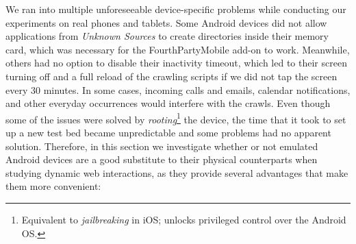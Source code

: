 \documentclass{acm_proc_article-sp}
\begin{document}
We ran into multiple unforeseeable device-specific problems while conducting our experiments on real phones and tablets. Some Android devices did not allow applications from \emph{Unknown Sources} to create directories inside their memory card, which was necessary for the FourthPartyMobile add-on to work. Meanwhile, others had no option to disable their inactivity timeout, which led to their screen turning off and a full reload of the crawling scripts if we did not tap the screen every 30 minutes. In some cases, incoming calls and emails, calendar notifications, and other everyday occurrences would interfere with the crawls. Even though some of the issues were solved by \emph{rooting}\footnote{Equivalent to \emph{jailbreaking} in iOS; unlocks privileged control over the Android OS.} the device, the time that it took to set up a new test bed became unpredictable and some problems had no apparent solution. Therefore, in this section we investigate whether or not emulated Android devices are a good substitute to their physical counterparts when studying dynamic web interactions, as they provide several advantages that make them more convenient:
\end{document}
